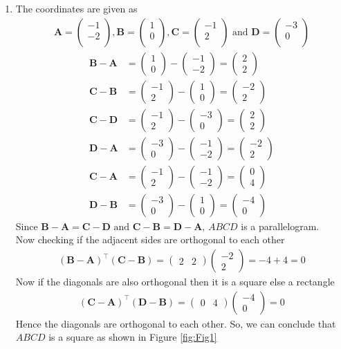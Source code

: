 \documentclass[12pt]{article}
\newcommand{\myvec}[1]{\ensuremath{\begin{pmatrix}#1\end{pmatrix}}}
\let\vec\mathbf
\begin{document}
\begin{enumerate}
\item The coordinates are given as
	\begin{align}
	\vec{A} = \myvec{
		-1\\
		-2\\
		},
	\vec{B} = \myvec{
		1\\
		0\\
		},
	\vec{C} = \myvec{
		-1\\
		2\\
		} \text{ and }
	\vec{D} = \myvec{
		-3\\
		0\\
		}
	\end{align}
	\begin{align}
		\vec{B} - \vec{A} &= \myvec{1\\0} - \myvec{-1\\-2} = \myvec{2\\2}\\
		\vec{C} - \vec{B} &= \myvec{-1\\2} - \myvec{1\\0} = \myvec{-2\\2}\\
		\vec{C} - \vec{D} &= \myvec{-1\\2} - \myvec{-3\\0} = \myvec{2\\2}\\
		\vec{D} - \vec{A} &= \myvec{-3\\0} - \myvec{-1\\-2} = \myvec{-2\\2}\\
		\vec{C} - \vec{A} &= \myvec{-1\\2} - \myvec{-1\\-2} = \myvec{0\\4}\\
		\vec{D} - \vec{B} &= \myvec{-3\\0} - \myvec{1\\0} = \myvec{-4\\0}
	\end{align}
		Since $\vec{B}-\vec{A} = \vec{C}-\vec{D} \text{ and } \vec{C}-\vec{B} = \vec{D}-\vec{A}$, $ABCD$ is a parallelogram.\\
	Now checking if the adjacent sides are orthogonal to each other
	\begin{align}
		(\vec{B}-\vec{A})^\top (\vec{C}-\vec{B}) = \myvec{2&2} \myvec{-2\\2} = -4+4 = 0
	\end{align}
	Now if the diagonals are also orthogonal then it is a square else a rectangle
	\begin{align}
		(\vec{C}-\vec{A})^\top (\vec{D}-\vec{B}) = \myvec{0&4} \myvec{-4\\0} = 0
	\end{align}
	Hence the diagonals are orthogonal to each other.
	So, we can conclude that $ABCD$ is a square as shown in Figure \ref{fig:Fig1}
 

\end{enumerate}
\end{document}
